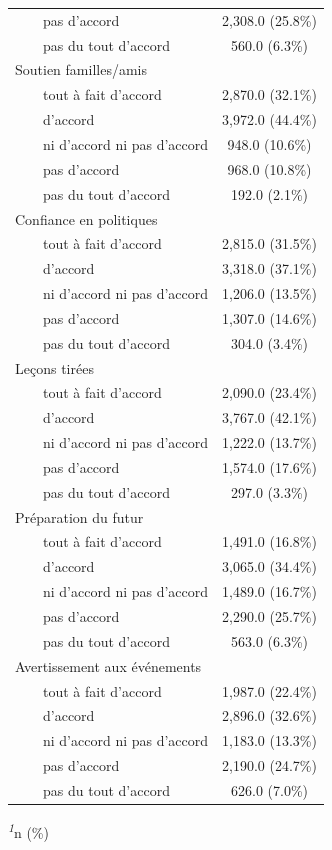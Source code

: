 \documentclass[
]{article}
\begin{document}
\begin{table}[!t]
\begin{tabular*}{\linewidth}{@{\extracolsep{\fill}}lc}
    pas d'accord & 2,308.0 (25.8\%) \\ 
    pas du tout d'accord & 560.0 (6.3\%) \\ 
Soutien familles/amis &  \\ 
    tout à fait d'accord & 2,870.0 (32.1\%) \\ 
    d'accord & 3,972.0 (44.4\%) \\ 
    ni d'accord ni pas d'accord & 948.0 (10.6\%) \\ 
    pas d'accord & 968.0 (10.8\%) \\ 
    pas du tout d'accord & 192.0 (2.1\%) \\ 
Confiance en politiques &  \\ 
    tout à fait d'accord & 2,815.0 (31.5\%) \\ 
    d'accord & 3,318.0 (37.1\%) \\ 
    ni d'accord ni pas d'accord & 1,206.0 (13.5\%) \\ 
    pas d'accord & 1,307.0 (14.6\%) \\ 
    pas du tout d'accord & 304.0 (3.4\%) \\ 
Leçons tirées &  \\ 
    tout à fait d'accord & 2,090.0 (23.4\%) \\ 
    d'accord & 3,767.0 (42.1\%) \\ 
    ni d'accord ni pas d'accord & 1,222.0 (13.7\%) \\ 
    pas d'accord & 1,574.0 (17.6\%) \\ 
    pas du tout d'accord & 297.0 (3.3\%) \\ 
Préparation du futur &  \\ 
    tout à fait d'accord & 1,491.0 (16.8\%) \\ 
    d'accord & 3,065.0 (34.4\%) \\ 
    ni d'accord ni pas d'accord & 1,489.0 (16.7\%) \\ 
    pas d'accord & 2,290.0 (25.7\%) \\ 
    pas du tout d'accord & 563.0 (6.3\%) \\ 
Avertissement aux événements &  \\ 
    tout à fait d'accord & 1,987.0 (22.4\%) \\ 
    d'accord & 2,896.0 (32.6\%) \\ 
    ni d'accord ni pas d'accord & 1,183.0 (13.3\%) \\ 
    pas d'accord & 2,190.0 (24.7\%) \\ 
    pas du tout d'accord & 626.0 (7.0\%) \\ 
\bottomrule
\end{tabular*}
\begin{minipage}{\linewidth}
\textsuperscript{\textit{1}}n (\%)\\
\end{minipage}
\end{table}
\end{document}
